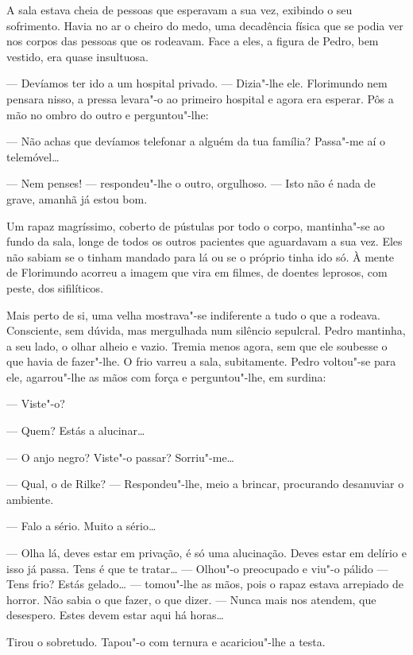 A sala estava cheia de pessoas que esperavam a sua vez, exibindo o seu
sofrimento. Havia no ar o cheiro do medo, uma decadência física que se
podia ver nos corpos das pessoas que os rodeavam. Face a eles, a figura
de Pedro, bem vestido, era quase insultuosa.

--- Devíamos ter ido a um hospital privado. ---  Dizia"-lhe ele. Florimundo
nem pensara nisso, a pressa levara"-o ao primeiro hospital e agora era
esperar. Pôs a mão no ombro do outro e perguntou"-lhe:

--- Não achas que devíamos telefonar a alguém da tua família? Passa"-me aí
o telemóvel\ldots{}

--- Nem penses! ---  respondeu"-lhe o outro, orgulhoso. ---  Isto não é nada de
grave, amanhã já estou bom.

Um rapaz magríssimo, coberto de pústulas por todo o corpo, mantinha"-se
ao fundo da sala, longe de todos os outros pacientes que aguardavam a
sua vez. Eles não sabiam se o tinham mandado para lá ou se o próprio
tinha ido só. À mente de Florimundo acorreu a imagem que vira em filmes,
de doentes leprosos, com peste, dos sifilíticos.

Mais perto de si, uma velha mostrava"-se indiferente a tudo o que a
rodeava. Consciente, sem dúvida, mas mergulhada num silêncio sepulcral.
Pedro mantinha, a seu lado, o olhar alheio e vazio. Tremia menos agora,
sem que ele soubesse o que havia de fazer"-lhe. O frio varreu a sala,
subitamente. Pedro voltou"-se para ele, agarrou"-lhe as mãos com força e
perguntou"-lhe, em surdina:

--- Viste"-o?

--- Quem? Estás a alucinar\ldots{}

--- O anjo negro? Viste"-o passar? Sorriu"-me\ldots{}

--- Qual, o de Rilke? --- Respondeu"-lhe, meio a brincar, procurando
desanuviar o ambiente.

--- Falo a sério. Muito a sério\ldots{}

--- Olha lá, deves estar em privação, é só uma alucinação. Deves estar em
delírio e isso já passa. Tens é que te tratar\ldots{} --- Olhou"-o
preocupado e viu"-o pálido --- Tens frio? Estás gelado\ldots{} --- tomou"-lhe as
mãos, pois o rapaz estava arrepiado de horror. Não sabia o que fazer, o
que dizer. ---  Nunca mais nos atendem, que desespero. Estes devem estar
aqui há horas\ldots{}

Tirou o sobretudo. Tapou"-o com ternura e acariciou"-lhe a testa.

